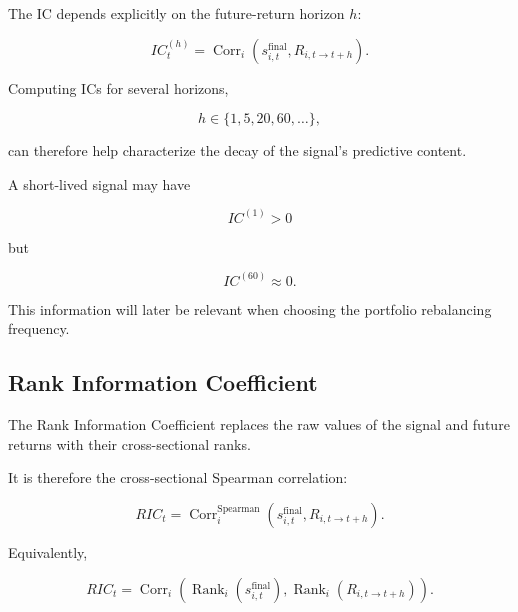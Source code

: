 \documentclass[11pt,a4paper]{article}
\begin{document}
The IC depends explicitly on the future-return horizon $h$:

\begin{equation}
IC_t^{(h)}
=
\operatorname{Corr}_i
\left(
s_{i,t}^{\mathrm{final}},
R_{i,t\rightarrow t+h}
\right).
\end{equation}

Computing ICs for several horizons,

\begin{equation}
h
\in
\{1,5,20,60,\ldots\},
\end{equation}

can therefore help characterize the decay of the signal's predictive content.

A short-lived signal may have

\begin{equation}
IC^{(1)}>0
\end{equation}

but

\begin{equation}
IC^{(60)}
\approx 0.
\end{equation}

This information will later be relevant when choosing the portfolio
rebalancing frequency.


\subsection{Rank Information Coefficient}
\label{subsec:rank_information_coefficient}

The Rank Information Coefficient replaces the raw values of the signal and
future returns with their cross-sectional ranks.

It is therefore the cross-sectional Spearman correlation:

\begin{equation}
\boxed{
RIC_t
=
\operatorname{Corr}_i^{\mathrm{Spearman}}
\left(
s_{i,t}^{\mathrm{final}},
R_{i,t\rightarrow t+h}
\right).
}
\end{equation}

Equivalently,

\begin{equation}
RIC_t
=
\operatorname{Corr}_i
\left(
\operatorname{Rank}_i
\left(
s_{i,t}^{\mathrm{final}}
\right),
\operatorname{Rank}_i
\left(
R_{i,t\rightarrow t+h}
\right)
\right).
\end{equation}
\end{document}
